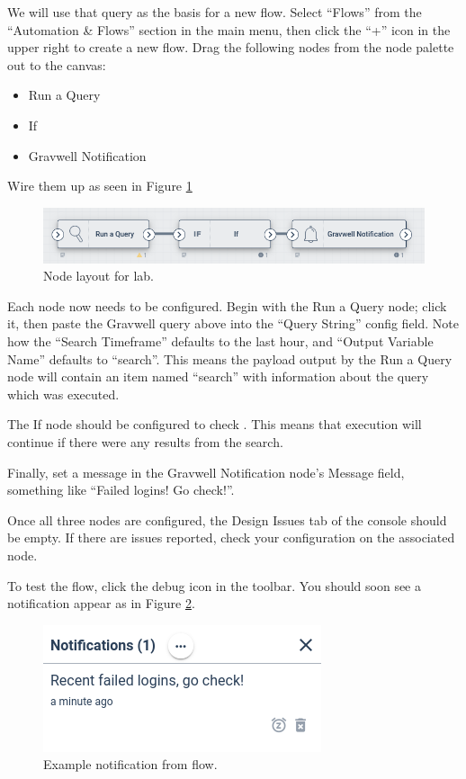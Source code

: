 We will use that query as the basis for a new flow. Select ``Flows'' from the ``Automation \& Flows'' section in the main menu, then click the ``+'' icon in the upper right to create a new flow. Drag the following nodes from the node palette out to the canvas:

\begin{itemize}
\item Run a Query
\item If
\item Gravwell Notification
\end{itemize}

Wire them up as seen in Figure \ref{fig:lab-nodes}

\begin{figure}
	\includegraphics[width=0.7\linewidth]{images/lab-nodes.png}
	\caption{Node layout for lab.}
	\label{fig:lab-nodes}
\end{figure}

Each node now needs to be configured. Begin with the Run a Query node; click it, then paste the Gravwell query above into the ``Query String'' config field. Note how the ``Search Timeframe'' defaults to the last hour, and ``Output Variable Name'' defaults to ``search''. This means the payload output by the Run a Query node will contain an item named ``search'' with information about the query which was executed.

The If node should be configured to check . This means that execution will continue if there were any results from the search.

Finally, set a message in the Gravwell Notification node's Message field, something like ``Failed logins! Go check!''.

Once all three nodes are configured, the Design Issues tab of the console should be empty. If there are issues reported, check your configuration on the associated node.

To test the flow, click the debug icon in the toolbar. You should soon see a notification appear as in Figure \ref{fig:lab-notification}.

\begin{figure}
	\includegraphics[width=0.7\linewidth]{images/lab-notification.png}
	\caption{Example notification from flow.}
	\label{fig:lab-notification}
\end{figure}

